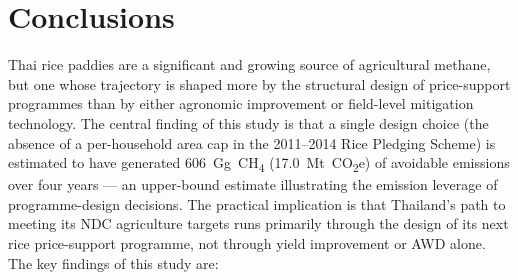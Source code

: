 \documentclass[fleqn,10pt]{olplainarticle}
\begin{document}
\section*{Conclusions}

Thai rice paddies are a significant and growing source of agricultural
methane, but one whose trajectory is shaped more by the structural design
of price-support programmes than by either agronomic improvement or
field-level mitigation technology.
The central finding of this study is that a single design choice (the absence
of a per-household area cap in the 2011--2014 Rice Pledging Scheme) is
estimated to have generated 606~Gg~CH\textsubscript{4} (17.0~Mt~CO\textsubscript{2}e)
of avoidable emissions over four years --- an upper-bound estimate illustrating
the emission leverage of programme-design decisions.
The practical implication is that Thailand's path to meeting its NDC
agriculture targets runs primarily through the design of its next rice
price-support programme, not through yield improvement or AWD alone.
The key findings of this study are:
\end{document}
